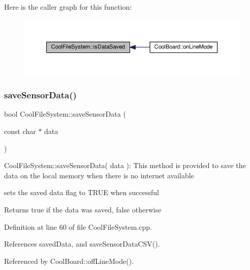 Here is the caller graph for this function\+:\nopagebreak
\begin{figure}[H]
\begin{center}
\leavevmode
\includegraphics[width=350pt]{classCoolFileSystem_a5a7eaeea7a9fbf8aaef651d862fa3b5b_icgraph}
\end{center}
\end{figure}
\mbox{\label{classCoolFileSystem_afa3a4feae94871d4d3b6bebb701c2e67}} 
\subsubsection{\texorpdfstring{save\+Sensor\+Data()}{saveSensorData()}}
{\footnotesize\ttfamily bool Cool\+File\+System\+::save\+Sensor\+Data (\begin{DoxyParamCaption}\item[{const char $\ast$}]{data }\end{DoxyParamCaption})}

Cool\+File\+System\+::save\+Sensor\+Data( data )\+: This method is provided to save the data on the local memory when there is no internet available

sets the saved data flag to T\+R\+UE when successful

\begin{DoxyReturn}{Returns}
true if the data was saved, false otherwise 
\end{DoxyReturn}


Definition at line 60 of file Cool\+File\+System.\+cpp.



References saved\+Data, and save\+Sensor\+Data\+C\+S\+V().



Referenced by Cool\+Board\+::off\+Line\+Mode().


